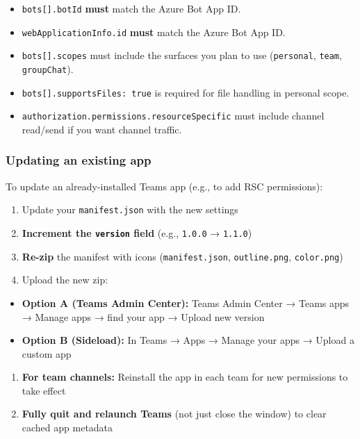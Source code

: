 \begin{itemize}
  \item \texttt{bots[].botId} \textbf{must} match the Azure Bot App ID.
  \item \texttt{webApplicationInfo.id} \textbf{must} match the Azure Bot App ID.
  \item \texttt{bots[].scopes} must include the surfaces you plan to use (\texttt{personal}, \texttt{team}, \texttt{groupChat}).
  \item \texttt{bots[].supportsFiles: true} is required for file handling in personal scope.
  \item \texttt{authorization.permissions.resourceSpecific} must include channel read/send if you want channel traffic.
\end{itemize}


\subsubsection{Updating an existing app}


To update an already-installed Teams app (e.g., to add RSC permissions):

\begin{enumerate}
  \item Update your \texttt{manifest.json} with the new settings
  \item \textbf{Increment the \texttt{version} field} (e.g., \texttt{1.0.0} → \texttt{1.1.0})
  \item \textbf{Re-zip} the manifest with icons (\texttt{manifest.json}, \texttt{outline.png}, \texttt{color.png})
  \item Upload the new zip:
\end{enumerate}

\begin{itemize}
  \item \textbf{Option A (Teams Admin Center):} Teams Admin Center → Teams apps → Manage apps → find your app → Upload new version
  \item \textbf{Option B (Sideload):} In Teams → Apps → Manage your apps → Upload a custom app
\end{itemize}

\begin{enumerate}
  \item \textbf{For team channels:} Reinstall the app in each team for new permissions to take effect
  \item \textbf{Fully quit and relaunch Teams} (not just close the window) to clear cached app metadata
\end{enumerate}



